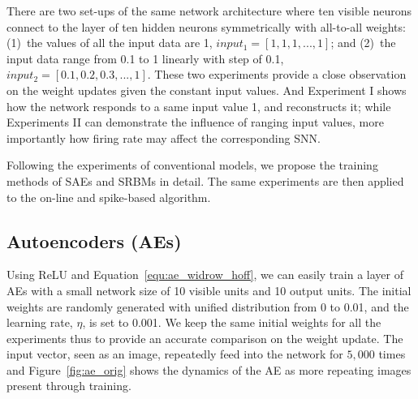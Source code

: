 There are two set-ups of the same network architecture where ten visible neurons connect to the layer of ten hidden neurons symmetrically with all-to-all weights: (1)~the values of all the input data are 1, $input_1 = [1, 1, 1,...,1]$; and (2)~the input data range from 0.1 to 1 linearly with step of 0.1, $input_2 = [0.1, 0.2, 0.3,...,1]$.
These two experiments provide a close observation on the weight updates given the constant input values.
And Experiment I shows how the network responds to a same input value 1, and reconstructs it; while Experiments II can demonstrate the influence of ranging input values, more importantly how firing rate may affect the corresponding SNN.

Following the experiments of conventional models, we propose the training methods of SAEs and SRBMs in detail.
The same experiments are then applied to the on-line and spike-based algorithm.

\subsection{Autoencoders (AEs)}
Using ReLU and Equation~\ref{equ:ae_widrow_hoff}, we can easily train a layer of AEs with a small network size of 10 visible units and 10 output units.
The initial weights are randomly generated with unified distribution from 0 to 0.01, and the learning rate, $\eta$, is set to 0.001.
We keep the same initial weights for all the experiments thus to provide an accurate comparison on the weight update.
The input vector, seen as an image, repeatedly feed into the network for $5,000$ times and Figure~\ref{fig:ae_orig} shows the dynamics of the AE as more repeating images present through training.

